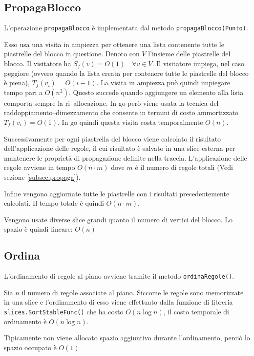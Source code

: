 \documentclass[a4paper,12pt]{article}
\begin{document}
	\subsection{PropagaBlocco}
	L'operazione \texttt{propagaBlocco} è implementata dal metodo \texttt{propagaBlocco(Punto)}.
	
	Esso usa una visita in ampiezza per ottenere una lista contenente tutte le piastrelle del blocco in questione.
	Denoto con \(V\) l'insieme delle piastrelle del blocco.
	Il visitatore ha \(S_f(v) = O(1) \quad \forall v \in V\).
	Il visitatore impiega, nel caso peggiore (ovvero quando la lista creata per contenere tutte le piastrelle del blocco è piena), \(T_f(v_i) = O(i-1)\).
	La visita in ampiezza può quindi impiegare tempo pari a \(O(n^2)\). 
	Questo succede quando aggiungere un elemento alla lista comporta sempre la ri--allocazione.
	In go però viene usata la tecnica del raddoppiamento--dimezzamento che consente in termini di costo ammortizzato \(T_f(v_i) = O(1)\).
	In go quindi questa visita costa temporalmente \(O(n)\).
	
	Successivamente per ogni piastrella del blocco viene calcolato il risultato dell'applicazione delle regole, il cui risultato è salvato in una slice esterna per mantenere le proprietà di propagazione definite nella traccia.
	L'applicazione delle regole avviene in tempo \(O(n \cdot m)\) dove \(m\) è il numero di regole totali (Vedi sezione \ref{subsec:propaga}).
	
	Infine vengono aggiornate tutte le piastrelle con i risultati precedentemente calcolati.
	Il tempo totale è quindi \(O(n \cdot m)\).
	
	Vengono usate diverse slice grandi quanto il numero di vertici del blocco.
	Lo spazio è quindi lineare: \(O(n)\)
	
	\subsection{Ordina}
	L'ordinamento di regole al piano avviene tramite il metodo \texttt{ordinaRegole()}.
	
	Sia \(n\) il numero di regole associate al piano.
	Siccome le regole sono memorizzate in una slice e l'ordinamento di esso viene effettuato dalla funzione di libreria \texttt{slices.SortStableFunc()} che ha costo \(O(n \log{n})\), il costo temporale di ordinamento è \(O(n \log{n})\).
	
	Tipicamente non viene allocato spazio aggiuntivo durante l'ordinamento, perciò lo spazio occupato è \(O(1)\)
	
\end{document}
